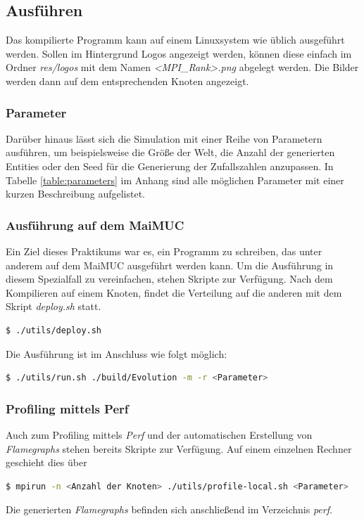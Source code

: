 \documentclass[course=erap]{aspdoc}
\begin{document}
\subsection{Ausführen}
Das kompilierte Programm kann auf einem Linuxsystem wie üblich ausgeführt werden. Sollen im Hintergrund Logos angezeigt werden, können diese einfach im Ordner \emph{res/logos} mit dem Namen \emph{<MPI\_Rank>.png} abgelegt werden. Die Bilder werden dann auf dem entsprechenden Knoten angezeigt.
\subsubsection{Parameter}
\label{sssec:exec-params}
Darüber hinaus lässt sich die Simulation mit einer Reihe von Parametern ausführen, um beispielsweise die Größe der Welt, die Anzahl der generierten Entities oder den Seed für die Generierung der Zufallszahlen anzupassen. In Tabelle \ref{table:parameters} im Anhang sind alle möglichen Parameter mit einer kurzen Beschreibung aufgelistet.

\subsubsection{Ausführung auf dem MaiMUC}
\label{sssec:exec-maimuc}
Ein Ziel dieses Praktikums war es, ein Programm zu schreiben, das unter anderem auf dem MaiMUC ausgeführt werden kann. Um die Ausführung in diesem Spezialfall zu vereinfachen, stehen Skripte zur Verfügung. Nach dem Kompilieren auf einem Knoten, findet die Verteilung auf die anderen mit dem Skript \emph{deploy.sh} statt.
\begin{lstlisting}[language=bash]
  $ ./utils/deploy.sh
\end{lstlisting}
Die Ausführung ist im Anschluss wie folgt möglich:
\begin{lstlisting}[language=bash]
  $ ./utils/run.sh ./build/Evolution -m -r <Parameter>
\end{lstlisting}

\subsubsection{Profiling mittels Perf}
Auch zum Profiling mittels \emph{Perf} und der automatischen Erstellung von \emph{Flamegraphs} stehen bereits Skripte zur Verfügung. Auf einem einzelnen Rechner geschieht dies über
\begin{lstlisting}[language=bash]
  $ mpirun -n <Anzahl der Knoten> ./utils/profile-local.sh <Parameter>
\end{lstlisting}
Die generierten \emph{Flamegraphs} befinden sich anschließend im Verzeichnis \emph{perf}.
\end{document}
